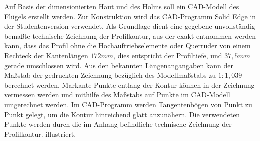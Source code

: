 Auf Basis der dimensionierten Haut und des Holms soll ein CAD-Modell des Flügels erstellt werden. Zur Konstruktion wird das CAD-Programm Solid Edge in der Studentenversion verwendet. Als Grundlage dient eine gegebene unvollständig bemaßte technische Zeichnung der Profilkontur, aus der exakt entnommen werden kann, dass das Profil ohne die Hochauftriebselemente oder Querruder von einem Rechteck der Kantenlängen $ 172mm $, dies entspricht der Profiltiefe, und $ 37,5mm $ gerade umschlossen wird. Aus den bekannten Längenangangaben kann der Maßstab der gedruckten Zeichnung bezüglich des Modellmaßstabs zu $ 1:1,039 $ berechnet werden. Markante Punkte entlang der Kontur können in der Zeichnung vermessen werden und mithilfe des Maßstabs auf Punkte im CAD-Modell umgerechnet werden. Im CAD-Programm werden Tangentenbögen von Punkt zu Punkt gelegt, um die Kontur hinreichend glatt anzunähern. Die verwendeten Punkte werden durch die im Anhang befindliche technische Zeichnung der Profilkontur. illustriert.\\

